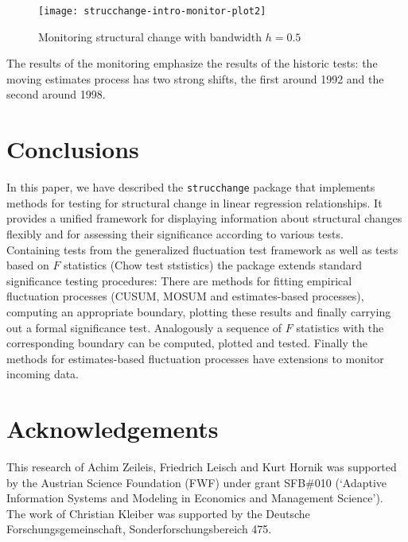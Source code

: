 \documentclass[10pt,a4paper]{article}
\begin{document}
\begin{figure}[htbp]
\begin{center}
\texttt{[image: strucchange-intro-monitor-plot2]}
\caption{\label{fig:monitor2} Monitoring structural change with
bandwidth $h=0.5$} \end{center}
\end{figure}

The results of the monitoring emphasize the results of the historic tests: the
moving estimates process has two strong shifts, the first around 1992 and the
second around 1998.

\section{Conclusions} \label{sec:conclusions}

In this paper, we have described the {\tt strucchange} package that implements
methods for testing for structural change in linear regression relationships.
It provides a unified framework for displaying information
about structural changes flexibly and for assessing their significance
according to various tests.\\

Containing tests from the generalized fluctuation test framework as well as
tests based on $F$ statistics (Chow test ststistics) the package extends
standard significance testing procedures: There are methods for fitting
empirical fluctuation processes (CUSUM, MOSUM and estimates-based
processes), computing an appropriate boundary, plotting these results and
finally carrying out a formal significance test. Analogously a sequence of $F$
statistics with the corresponding boundary can be computed, plotted and tested.
Finally the methods for estimates-based fluctuation processes have extensions to
monitor incoming data.


\section*{Acknowledgements}

This research of Achim Zeileis, Friedrich Leisch and Kurt Hornik was supported
by the Austrian Science Foundation (FWF) under grant SFB\#010 (`Adaptive
Information Systems and Modeling in Economics and Management Science').\\
The work of Christian Kleiber was supported by the
Deutsche Forschungsgemeinschaft, Sonderforschungsbereich 475.

\newpage
\end{document}

